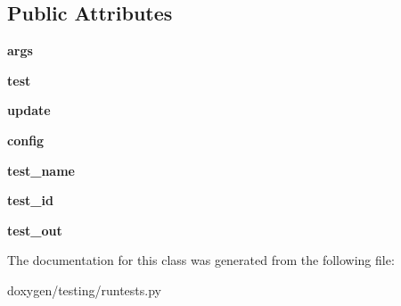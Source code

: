 \subsection*{Public Attributes}
\begin{DoxyCompactItemize}
\item 
\mbox{\label{classruntests_1_1_tester_a5514a9ce91fe2a4935bdfbf5b9e2d761}} 
{\bfseries args}
\item 
\mbox{\label{classruntests_1_1_tester_a2bcfeddb39d2798f36c17cdf5ef774ee}} 
{\bfseries test}
\item 
\mbox{\label{classruntests_1_1_tester_ac7307f51717ccea5db0d642258f8f1a5}} 
{\bfseries update}
\item 
\mbox{\label{classruntests_1_1_tester_a1cefb18f5842b6c20693a7ca535d58eb}} 
{\bfseries config}
\item 
\mbox{\label{classruntests_1_1_tester_ae55779fc1edf95ea84f69f8bb04db092}} 
{\bfseries test\+\_\+name}
\item 
\mbox{\label{classruntests_1_1_tester_ad7757bfab23b634a8355fb4c3962fa6f}} 
{\bfseries test\+\_\+id}
\item 
\mbox{\label{classruntests_1_1_tester_af3283682d1d04e4fda22f5984e89f60e}} 
{\bfseries test\+\_\+out}
\end{DoxyCompactItemize}


The documentation for this class was generated from the following file\+:\begin{DoxyCompactItemize}
\item 
doxygen/testing/runtests.\+py\end{DoxyCompactItemize}
